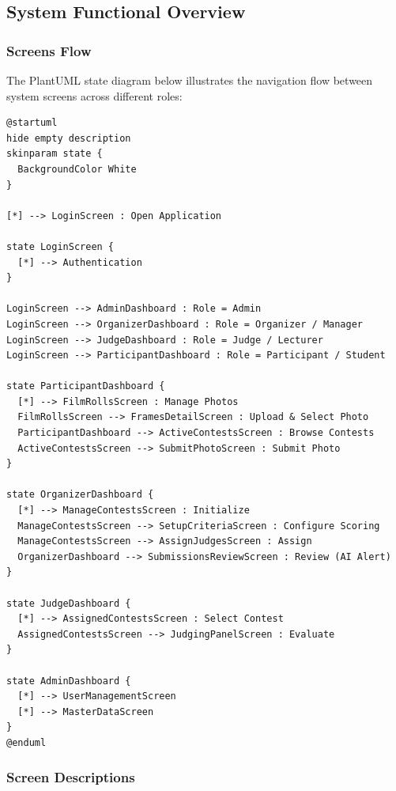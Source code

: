 \documentclass[12pt,a4paper]{article}
\begin{document}
\subsection{System Functional Overview}

\subsubsection{Screens Flow}

The PlantUML state diagram below illustrates the navigation flow between system screens across different roles:

\begin{lstlisting}[caption={Screens Flow Source Code (PlantUML)}]
@startuml
hide empty description
skinparam state {
  BackgroundColor White
}

[*] --> LoginScreen : Open Application

state LoginScreen {
  [*] --> Authentication
}

LoginScreen --> AdminDashboard : Role = Admin
LoginScreen --> OrganizerDashboard : Role = Organizer / Manager
LoginScreen --> JudgeDashboard : Role = Judge / Lecturer
LoginScreen --> ParticipantDashboard : Role = Participant / Student

state ParticipantDashboard {
  [*] --> FilmRollsScreen : Manage Photos
  FilmRollsScreen --> FramesDetailScreen : Upload & Select Photo
  ParticipantDashboard --> ActiveContestsScreen : Browse Contests
  ActiveContestsScreen --> SubmitPhotoScreen : Submit Photo
}

state OrganizerDashboard {
  [*] --> ManageContestsScreen : Initialize
  ManageContestsScreen --> SetupCriteriaScreen : Configure Scoring
  ManageContestsScreen --> AssignJudgesScreen : Assign
  OrganizerDashboard --> SubmissionsReviewScreen : Review (AI Alert)
}

state JudgeDashboard {
  [*] --> AssignedContestsScreen : Select Contest
  AssignedContestsScreen --> JudgingPanelScreen : Evaluate
}

state AdminDashboard {
  [*] --> UserManagementScreen
  [*] --> MasterDataScreen
}
@enduml
\end{lstlisting}

\subsubsection{Screen Descriptions}
\end{document}
